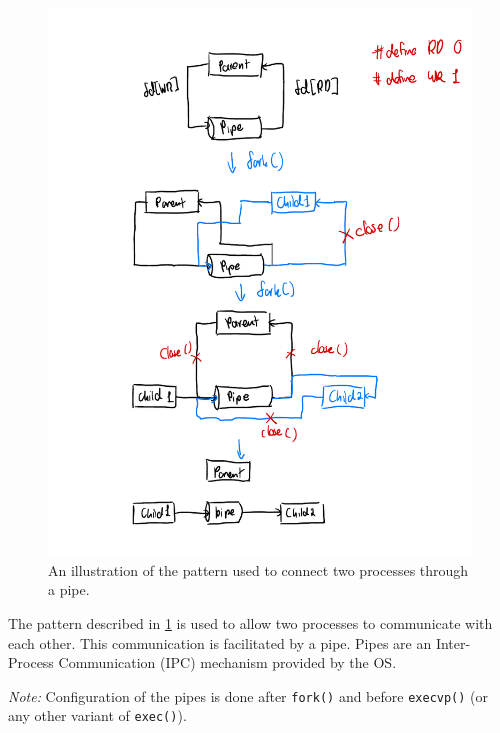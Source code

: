 \documentclass[12pt]{article}
\begin{document}
\begin{figure}[H]
\centering
\includegraphics{task1qb}
\caption{An illustration of the pattern used to connect two
processes through a pipe.}
\label{create_pipe}
\end{figure}

\newpage

The pattern described in \ref{create_pipe} is used to allow two
processes to communicate with each other. This communication is
facilitated by a pipe. Pipes are an Inter-Process
Communication (IPC) mechanism provided by the OS.



\textit{Note:} Configuration of the pipes is done after
\texttt{fork()} and before \texttt{execvp()} (or any other
variant of \texttt{exec()}).
\end{document}
